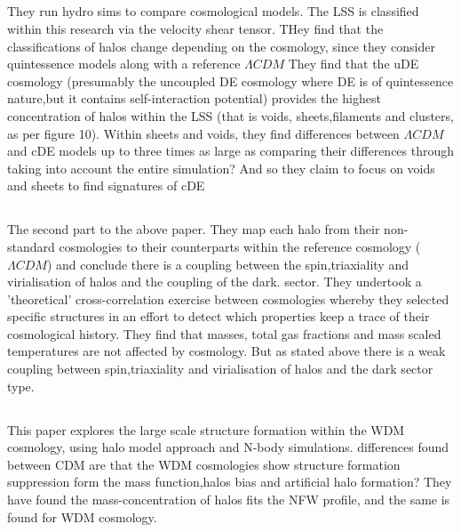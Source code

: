 \documentclass[fleqn,usenatbib]{mnras}
\begin{document}
\subsection{\citet{Carlesi_14a}}
They run hydro sims to compare cosmological models. The LSS is classified within this research via the velocity shear tensor. THey find that the classifications of halos change depending on the cosmology, since they consider quintessence models along with a reference $\Lambda CDM$
They find that the uDE cosmology (presumably the uncoupled DE cosmology where DE is of quintessence nature,but it contains self-interaction potential) provides the highest concentration of halos within the LSS (that is voids, sheets,filaments and clusters, as per figure 10). Within sheets and voids, they find differences between $\Lambda CDM$ and cDE models up to three times as large as comparing their differences through taking into account the entire simulation? And so they claim to focus on voids and sheets to find signatures of cDE 


\subsection{\citet{Carlesi_14b}}
The second part to the above paper. They map each halo from their non-standard cosmologies to their counterparts within the reference cosmology ($\Lambda CDM$) and conclude there is a coupling between the spin,triaxiality and virialisation of halos and the coupling of the dark. sector.
They undertook a 'theoretical' cross-correlation exercise between cosmologies whereby they selected specific structures in an effort to detect which properties keep a trace of their cosmological history. They find that masses, total gas fractions and mass scaled temperatures are not affected by cosmology. But as stated above there is a weak coupling between spin,triaxiality and virialisation of halos and the dark sector type. 

\subsection{\citet{Schneider_12}}
This paper explores the large scale structure formation within the WDM cosmology, using halo model approach and N-body simulations. differences found between CDM are that the WDM cosmologies show structure formation suppression form the mass function,halos bias and artificial halo formation? They have found the mass-concentration of halos fits the NFW profile, and the same is found for WDM cosmology.
\end{document}
